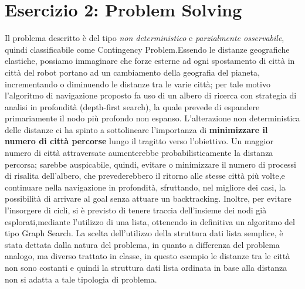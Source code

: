 	\section{Esercizio 2: Problem Solving}
		\label{sec:es2}
		Il problema descritto è del tipo \emph{non deterministico} e \emph{parzialmente osservabile}, quindi classificabile come \textsf{Contingency Problem}.Essendo le distanze geografiche  elastiche, possiamo immaginare che forze esterne ad ogni spostamento di città in città del robot portano ad un  cambiamento della geografia del pianeta, incrementando o diminuendo le distanze tra le varie città; per tale motivo l'algoritmo di navigazione proposto fa uso di un albero di ricerca con strategia di analisi in profondità (\textsf{depth-first search}), la quale prevede di espandere primariamente il nodo più profondo non espanso.
		\newline
		 L'alterazione non deterministica delle distanze ci ha spinto a sottolineare l'importanza di \textbf{minimizzare il numero di città percorse} lungo il tragitto verso l'obiettivo. Un maggior numero di città attraversate aumenterebbe probabilisticamente la distanza percorsa; sarebbe auspicabile, quindi, evitare o minimizzare il numero di processi di risalita dell'albero, che prevederebbero il ritorno alle stesse città più volte,e continuare nella navigazione in profondità, sfruttando, nel migliore dei casi, la possibilità di arrivare al \textsf{goal} senza attuare un \textsf{backtracking}. Inoltre, per evitare l'insorgere di cicli, si è previsto di tenere traccia dell'insieme dei nodi già esplorati,mediante l'utilizzo di una lista, ottenendo in definitiva un algoritmo del tipo \textsf{Graph Search}.
La scelta dell'utilizzo della struttura dati lista semplice, è stata dettata dalla natura del problema, in quanto a differenza del problema analogo, ma diverso trattato in classe, in questo esempio le distanze tra le città non sono costanti e quindi la struttura dati lista ordinata in base alla distanza non si adatta a tale tipologia di problema.
